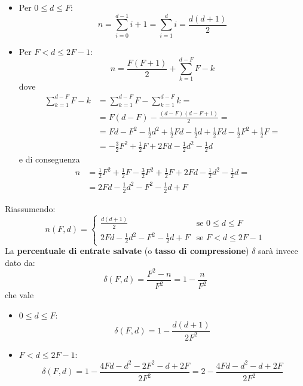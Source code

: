     \begin{itemize}
        \item Per $ 0 \le d \le F$:
        \begin{equation}
        n = \sum_{i=0}^{d-1}{i+1} = \sum_{i=1}^{d}{i} = \frac{d(d+1)}{2}
        \end{equation}
        
        \item Per $ F < d \le 2F - 1$:
        \begin{equation}
        n = \frac{F(F+1)}{2} + \sum_{k=1}^{d-F}{F-k}
        \end{equation}
        dove
        \begin{align*}
            \sum_{k=1}^{d-F}{F-k} &= \sum_{k=1}^{d-F}{F} - \sum_{k=1}^{d-F}{k} = \\
                             &= F(d - F) - \frac{(d - F)(d - F + 1)}{2} = \\
                             &= Fd - F^2 - \frac{1}{2}d^2 + \frac{1}{2}Fd - \frac{1}{2}d + \frac{1}{2}Fd - \frac{1}{2}F^2 + \frac{1}{2}F = \\
                             &= -\frac{3}{2}F^2 + \frac{1}{2}F + 2Fd - \frac{1}{2}d^2 - \frac{1}{2}d
        \end{align*}
        e di conseguenza
        \begin{align*}
        n &= \frac{1}{2}F^2 + \frac{1}{2}F - \frac{3}{2}F^2 + \frac{1}{2}F + 2Fd - \frac{1}{2}d^2 - \frac{1}{2}d = \\
          &= 2Fd - \frac{1}{2}d^2 - F^2 - \frac{1}{2}d + F
        \end{align*}
    \end{itemize}
    Riassumendo:
    \begin{equation}
    n(F, d) = \begin{cases}
              \frac{d(d+1)}{2} & \text{se } 0 \le d \le F \\
              2Fd - \frac{1}{2}d^2 - F^2 - \frac{1}{2}d + F & \text{se } F < d \le 2F - 1
            \end{cases}
    \end{equation}
    La \textbf{percentuale di entrate salvate} (o \textbf{tasso di compressione}) $\delta$ sarà invece dato da:
    \begin{equation}
        \delta(F, d) = \frac{F^2 - n}{F^2} = 1 - \frac{n}{F^2}
    \end{equation}
    che vale
    \begin{itemize}
        \item $0 \le d \le F$:
        \begin{equation}
            \delta(F, d) = 1 - \frac{d(d+1)}{2F^2}
        \end{equation}
        
        \item $ F < d \le 2F - 1$:
        \begin{equation}
            \delta(F, d) = 1 - \frac{4Fd - d^2 - 2F^2 - d + 2F}{2F^2} = 2 - \frac{4Fd - d^2 - d + 2F}{2F^2}
        \end{equation}
    \end{itemize}

